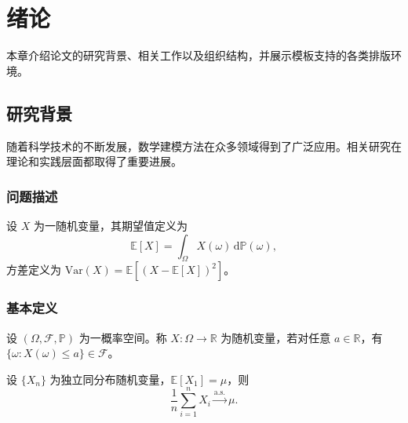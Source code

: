 %
%
%

\chapter{绪论}
\label{chap:introduction}

本章介绍论文的研究背景、相关工作以及组织结构，并展示模板支持的各类排版环境。

\section{研究背景}
\label{sec:background}

随着科学技术的不断发展，数学建模方法在众多领域得到了广泛应用。相关研究在理论和实践层面都取得了重要进展\cite{ho2020denoising}。

\subsection{问题描述}
\label{subsec:problem}

设 \(X\) 为一随机变量，其期望值定义为
\begin{equation}
\mathbb{E}[X] = \int_{\Omega} X(\omega) \,\mathrm{d}\mathbb{P}(\omega),
\label{eq:expectation}
\end{equation}
方差定义为 \(\mathrm{Var}(X) = \mathbb{E}[(X - \mathbb{E}[X])^2]\)。

\subsection{基本定义}
\label{subsec:definitions}

\begin{definition}
设 \((\Omega, \mathcal{F}, \mathbb{P})\) 为一概率空间。称 \(X: \Omega \to \mathbb{R}\) 为随机变量，若对任意 \(a \in \mathbb{R}\)，有 \(\{\omega: X(\omega) \leq a\} \in \mathcal{F}\)。
\end{definition}

\begin{theorem}[大数定律]
设 \(\{X_n\}\) 为独立同分布随机变量，\(\mathbb{E}[X_1] = \mu\)，则
\begin{equation}
\frac{1}{n}\sum_{i=1}^n X_i \xrightarrow{\text{a.s.}} \mu.
\label{eq:lln}
\end{equation}
\end{theorem}

